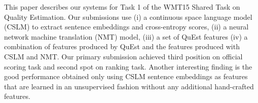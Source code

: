 This paper describes our systems for Task 1 of the WMT15 Shared Task on Quality Estimation. Our submissions use (i) a continuous space language model (CSLM) to extract sentence embeddings and cross-entropy scores, (ii) a neural network machine translation (NMT) model, (iii) a set of QuEst features (iv) a combination of features produced by QuEst and the features produced with CSLM and NMT. Our primary submission achieved third position on official scoring task and second spot on ranking task. Another interesting finding is the good performance  obtained only using CSLM sentence embeddings as features  that are learned in an unsupervised fashion without any additional hand-crafted features.

